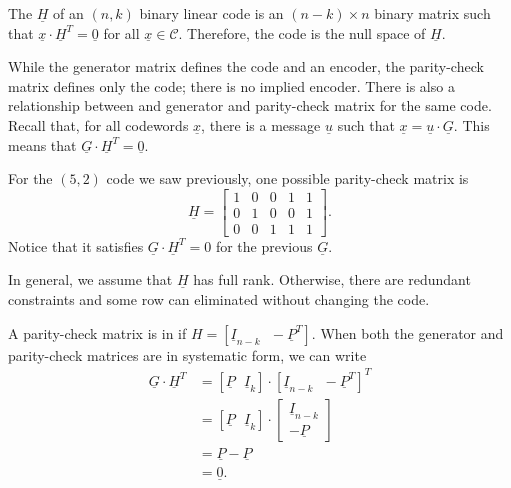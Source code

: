 \begin{definition}
The  $\underline{H}$ of an $(n,k)$ binary linear code is an $(n-k)\times n$ binary matrix such that $\underline{x}\cdot\underline{H}^{T}=\underline{0}$ for all $\underline{x}\in\mathcal{C}$.
Therefore, the code is the null space of $\underline{H}$.
\end{definition}

While the generator matrix defines the code and an encoder, the parity-check matrix defines only the code; there is no implied encoder.
There is also a relationship between and generator and parity-check matrix for the same code.
Recall that, for all codewords $\underline{x}$,  there is a message $\underline{u}$ such that $\underline{x}=\underline{u}\cdot\underline{G}$.
This means that $\underline{G}\cdot\underline{H}^{T}=\underline{0}$.

\begin{example}
For the $(5,2)$ code we saw previously, one possible parity-check matrix is
\[ \underline{H}=\left[\begin{array}{ccccc}
1 & 0 & 0 & 1 & 1\\
0 & 1 & 0 & 0 & 1\\
0 & 0 & 1 & 1 & 1\end{array}\right]. \]
Notice that it satisfies $\underline{G}\cdot\underline{H}^{T}=0$ for the previous $\underline{G}$.
\end{example}

In general, we assume that $\underline{H}$ has full rank.
Otherwise, there are redundant constraints and some row can eliminated without changing the code.

A parity-check matrix is in  if $H=\left[\underline{I}_{n-k}\,\,\,\,-\underline{P}^{T}\right]$.
When both the generator and parity-check matrices are in systematic form, we can write
\begin{align*}
\underline{G}\cdot\underline{H}^{T}
&=\left[\underline{P}\,\,\,\,\underline{I}_{k}\right]\cdot\left[\underline{I}_{n-k}\,\,\,\,-\underline{P}^{T}\right]^{T} \\
&=\left[\underline{P}\,\,\,\,\underline{I}_{k}\right]\cdot \left[ \begin{array}{c} \underline{I}_{n-k} \\ -\underline{P} \end{array} \right] \\
&=\underline{P}-\underline{P} \\
&=\underline{0}.
\end{align*}

